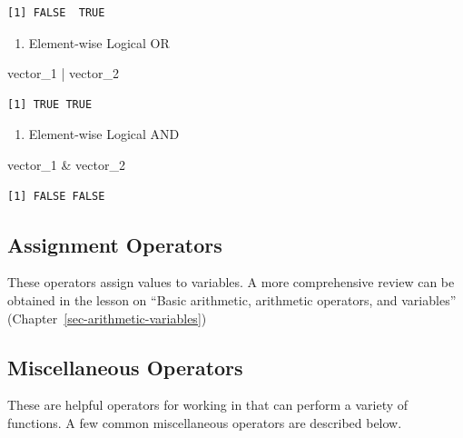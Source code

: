 \documentclass[
  letterpaper,
  DIV=11,
  numbers=noendperiod]{scrreprt}
\newenvironment{Shaded}{\begin{snugshade}}{\end{snugshade}}
\newcommand{\NormalTok}[1]{\textcolor[rgb]{0.00,0.23,0.31}{#1}}
\newcommand{\SpecialCharTok}[1]{\textcolor[rgb]{0.37,0.37,0.37}{#1}}
\providecommand{\tightlist}{%
  \setlength{\itemsep}{0pt}\setlength{\parskip}{0pt}}\usepackage{longtable,booktabs,array}
\begin{document}
\begin{verbatim}
[1] FALSE  TRUE
\end{verbatim}

\begin{enumerate}
\def\labelenumi{\alph{enumi}.}
\setcounter{enumi}{1}
\tightlist
\item
  Element-wise Logical OR
\end{enumerate}

\begin{Shaded}
\begin{Highlighting}[]
\NormalTok{vector\_1 }\SpecialCharTok{|}\NormalTok{ vector\_2}
\end{Highlighting}
\end{Shaded}

\begin{verbatim}
[1] TRUE TRUE
\end{verbatim}

\begin{enumerate}
\def\labelenumi{\alph{enumi}.}
\setcounter{enumi}{2}
\tightlist
\item
  Element-wise Logical AND
\end{enumerate}

\begin{Shaded}
\begin{Highlighting}[]
\NormalTok{vector\_1 }\SpecialCharTok{\&}\NormalTok{ vector\_2}
\end{Highlighting}
\end{Shaded}

\begin{verbatim}
[1] FALSE FALSE
\end{verbatim}

\subsection{Assignment Operators}\label{assignment-operators}

These operators assign values to variables. A more comprehensive review
can be obtained in the lesson on ``Basic arithmetic, arithmetic
operators, and variables'' (Chapter~\ref{sec-arithmetic-variables})

\subsection{Miscellaneous Operators}\label{miscellaneous-operators}

These are helpful operators for working in that can perform a variety of
functions. A few common miscellaneous operators are described below.
\end{document}
